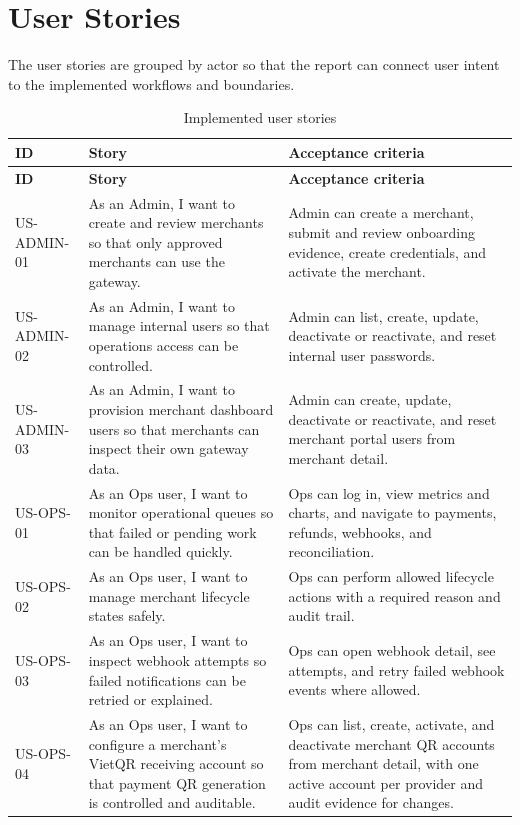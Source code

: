 \chapter{User Stories}

The user stories are grouped by actor so that the report can connect user
intent to the implemented workflows and boundaries.

\begin{longtable}{L{0.17\textwidth}L{0.37\textwidth}L{0.36\textwidth}}
\caption{Implemented user stories}\\
\toprule
\textbf{ID} & \textbf{Story} & \textbf{Acceptance criteria} \\
\midrule
\endfirsthead
\toprule
\textbf{ID} & \textbf{Story} & \textbf{Acceptance criteria} \\
\midrule
\endhead
US-ADMIN-01 & As an Admin, I want to create and review merchants so that only approved merchants can use the gateway. & Admin can create a merchant, submit and review onboarding evidence, create credentials, and activate the merchant. \\
\bodyrowrule
US-ADMIN-02 & As an Admin, I want to manage internal users so that operations access can be controlled. & Admin can list, create, update, deactivate or reactivate, and reset internal user passwords. \\
\bodyrowrule
US-ADMIN-03 & As an Admin, I want to provision merchant dashboard users so that merchants can inspect their own gateway data. & Admin can create, update, deactivate or reactivate, and reset merchant portal users from merchant detail. \\
\bodyrowrule
US-OPS-01 & As an Ops user, I want to monitor operational queues so that failed or pending work can be handled quickly. & Ops can log in, view metrics and charts, and navigate to payments, refunds, webhooks, and reconciliation. \\
\bodyrowrule
US-OPS-02 & As an Ops user, I want to manage merchant lifecycle states safely. & Ops can perform allowed lifecycle actions with a required reason and audit trail. \\
\bodyrowrule
US-OPS-03 & As an Ops user, I want to inspect webhook attempts so failed notifications can be retried or explained. & Ops can open webhook detail, see attempts, and retry failed webhook events where allowed. \\
\bodyrowrule
US-OPS-04 & As an Ops user, I want to configure a merchant's VietQR receiving account so that payment QR generation is controlled and auditable. & Ops can list, create, activate, and deactivate merchant QR accounts from merchant detail, with one active account per provider and audit evidence for changes. \\

\end{longtable}
